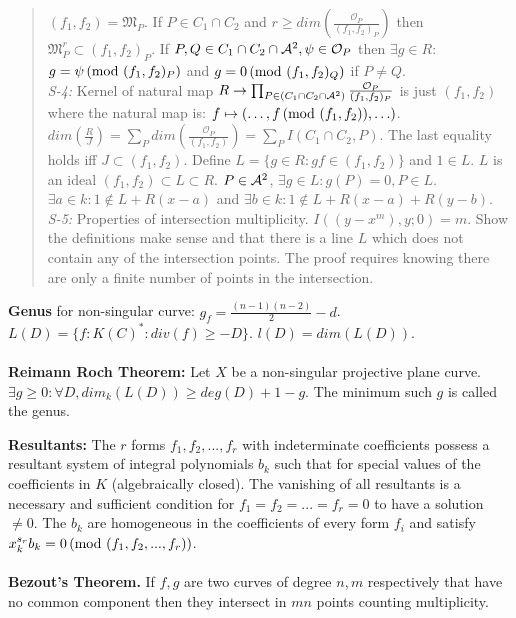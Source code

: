 \begin{quote}
$(f_1 , f_2) = {\mathfrak M}_P$.
If $P \in C_1 \cap C_2$ and $r \ge dim({\frac {{\mathcal O}_P} {(f_1 , f_2)_P}})$ then
${\mathfrak M}_P^r \subset (f_1, f_2)_P$.  If 
$P, Q \in C_1 \cap C_2 \cap {\cal A}^2, \psi \in {\mathcal O}_P$
then $\exists g \in R$: 
$g= \psi \thinspace \textnormal{(mod } (f_1 , f_2)_P \textnormal{)}$ and 
$g= 0 \thinspace \textnormal{(mod } (f_1 , f_2)_Q \textnormal{)}$ if $P \ne Q$.
\\
\emph{S-4:} Kernel of natural map $R \rightarrow \prod_{P \in (C_1 \cap C_2 \cap {\cal A}^2)}
{\frac {{\mathcal O}_P} {(f_1 , f_2)_P}}$ is just $(f_1 , f_2)$ where the natural map is:
$f \mapsto (\ldots, f \thinspace \textnormal{(mod } (f_1, f_2) \textnormal{)}, \ldots)$.  
$dim({\frac R J})
= \sum_P dim( {\frac  {{\mathcal O}_P} {(f_1 , f_2)}})
= \sum_P I(C_1 \cap C_2, P)$.  The last equality holds iff $J \subset (f_1 , f_2)$.
Define $L= \{ g \in R : gf \in (f_1 , f_2) \}$ and $1 \in L$.  $L$ is an ideal
$(f_1 , f_2) \subset L \subset R$.  
$P \in {\cal A}^2$, $\exists g \in L: g(P) =0, P \in L$.  
$\exists a \in k: 1 \notin L +R(x-a)$ and
$\exists b \in k: 1 \notin L +R(x-a) + R(y-b)$.
\\
\emph{S-5:}
Properties of intersection multiplicity.  $I((y-x^m), y; 0)= m$.  Show the definitions
make sense and that there is a line $L$ which does not contain any of the intersection
points.  The proof requires knowing there are only a finite number of points in the
intersection.
\end{quote}
{\bf Genus} for non-singular curve: $g_f = {\frac {(n-1)(n-2)} {2}} - d$.
$L(D)= \{ f: K(C)^*: div(f) \ge -D \}$.  $l(D)= dim (L(D))$.
\\
\\
{\bf Reimann Roch Theorem:} Let
$X$ be a non-singular projective plane curve.  $\exists g \ge 0: \forall D,
dim_k(L(D)) \ge deg(D)+1-g$.  The minimum such $g$ is called the genus.
\begin{quote}
\end{quote}
{\bf Resultants:} 
The $r$ forms $f_1,f_2,...,f_r$ with indeterminate coefficients possess a resultant
system of integral polynomials $b_k$ such that for special values of the 
coefficients in $K$ (algebraically closed).  
The vanishing of all resultants is a necessary and 
sufficient condition for
$f_1= f_2= ... =f_r= 0$ to have a solution $\ne 0$.  The $b_k$ are homogeneous
in the coefficients of every form $f_i$ and 
satisfy $x_k^{s_r}b_k=0 \thinspace \textnormal{(mod } (f_1, f_2,...,f_r) \textnormal{)}$.  
\\
\\
{\bf Bezout's Theorem.}  If $f, g$ are two curves of degree $n,m$ respectively that
have no common component then they intersect in $mn$ points counting multiplicity.
